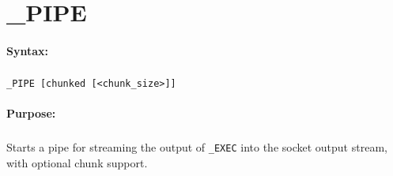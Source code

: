 
\newpage
\section{\_PIPE}
\label{cmd:_PIPE}

\paragraph{Syntax:}
\subparagraph{}
\texttt{\_PIPE [chunked [<chunk\_size>]]}

\paragraph{Purpose:}
\subparagraph{}
Starts a pipe for streaming the output of \texttt{\_EXEC} 
into the socket output stream, with optional chunk support.